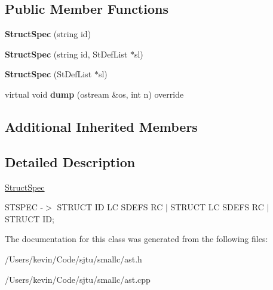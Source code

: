\subsection*{Public Member Functions}
\begin{DoxyCompactItemize}
\item 
\mbox{\label{class_struct_spec_a40337f31924605b272f59cf74c8369f7}} 
{\bfseries Struct\+Spec} (string id)
\item 
\mbox{\label{class_struct_spec_aadfa6e7e14621e2bce084171ac8808a1}} 
{\bfseries Struct\+Spec} (string id, St\+Def\+List $\ast$sl)
\item 
\mbox{\label{class_struct_spec_af0ed4377c426336943b18090876a20eb}} 
{\bfseries Struct\+Spec} (St\+Def\+List $\ast$sl)
\item 
\mbox{\label{class_struct_spec_a3bff556be3067bf2258730883e72c1a3}} 
virtual void {\bfseries dump} (ostream \&os, int n) override
\end{DoxyCompactItemize}
\subsection*{Additional Inherited Members}


\subsection{Detailed Description}
\hyperlink{class_struct_spec}{Struct\+Spec}

S\+T\+S\+P\+EC -\/$>$ S\+T\+R\+U\+CT ID LC S\+D\+E\+FS RC $\vert$ S\+T\+R\+U\+CT LC S\+D\+E\+FS RC $\vert$ S\+T\+R\+U\+CT ID; 

The documentation for this class was generated from the following files\+:\begin{DoxyCompactItemize}
\item 
/\+Users/kevin/\+Code/sjtu/smallc/ast.\+h\item 
/\+Users/kevin/\+Code/sjtu/smallc/ast.\+cpp\end{DoxyCompactItemize}
